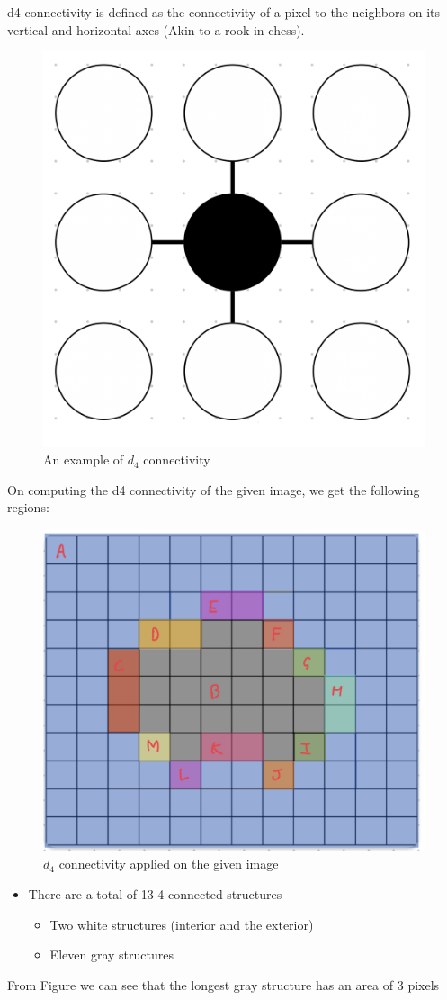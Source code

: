 \documentclass[a4paper,11pt]{article}
\begin{document}
d4 connectivity is defined as the connectivity of a pixel to the neighbors on its vertical and horizontal axes (Akin to a rook in chess). \newline
\begin{figure}[h]
    \centering
    \includegraphics[width=0.3\linewidth]{figs/d4_connectivity.png}
    \caption{An example of $d_4$ connectivity}
\end{figure}
\newline
On computing the d4 connectivity of the given image, we get the following regions:
\begin{figure}[h]
    \centering
    \includegraphics[width=0.6\linewidth]{figs/d4_connected_image.png}
    \caption{$d_4$ connectivity applied on the given image}
\end{figure}
\begin{itemize}
    \item There are a total of 13 4-connected structures
    \begin{itemize}
        \item Two white structures (interior and the exterior)
        \item Eleven gray structures
    \end{itemize}
\end{itemize}

From Figure %
we can see that the longest gray structure has an area of 3 pixels
\end{document}
